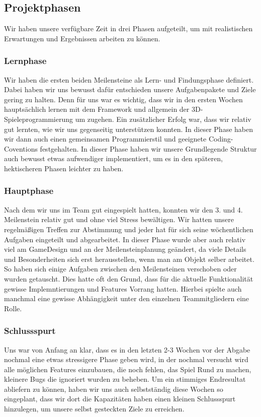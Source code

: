 \documentclass[12pt]{article}
\begin{document}
\vspace{2cm}
\subsection{Projektphasen}
Wir haben unsere verfügbare Zeit in drei Phasen aufgeteilt, um mit realistischen Erwartungen und Ergebnissen arbeiten zu können. \newline
\subsubsection{Lernphase}
Wir haben die ersten beiden Meilensteine als Lern- und Findungsphase definiert. Dabei haben wir uns bewusst dafür entschieden unsere Aufgabenpakete und Ziele gering zu halten.
Denn für uns war es wichtig, dass wir in den ersten Wochen hauptsächlich lernen mit dem Framework und allgemein der 3D-Spieleprogrammierung um zugehen. Ein zusätzlicher Erfolg war, dass wir relativ gut lernten, wie wir uns gegenseitig unterstützen konnten. In dieser Phase haben wir dann auch einen gemeinsamen Programmierstil und geeignete Coding-Coventions festgehalten. In dieser Phase haben wir unsere Grundlegende Struktur auch bewusst etwas aufwendiger implementiert, um es in den späteren, hektischeren Phasen leichter zu haben.

\subsubsection{Hauptphase}
Nach dem wir uns im Team gut eingespielt hatten, konnten wir den 3. und 4. Meilenstein relativ gut und ohne viel Stress bewältigen. Wir hatten unsere regelmäßigen Treffen zur Abstimmung und jeder hat für sich seine wöchentlichen Aufgaben eingeteilt und abgearbeitet. \newline
In dieser Phase wurde aber auch relativ viel am GameDesign und an der Meilensteinplanung geändert, da viele Details und Besonderheiten sich erst herausstellen, wenn man am Objekt selber arbeitet. So haben sich einige Aufgaben zwischen den Meilensteinen verschoben oder wurden getauscht. Dies hatte oft den Grund, dass für die aktuelle Funktionalität gewisse Implemntierungen und Features Vorrang hatten. Hierbei spielte auch manchmal eine gewisse Abhängigkeit unter den einzelnen Teammitgliedern eine Rolle.

\subsubsection{Schlussspurt}
Uns war von Anfang an klar, dass es in den letzten 2-3 Wochen vor der Abgabe nochmal eine etwas stressigere Phase geben wird, in der nochmal versucht wird alle möglichen Features einzubauen, die noch fehlen, das Spiel Rund zu machen, kleinere Bugs die ignoriert wurden zu beheben. Um ein stimmiges Endresultat abliefern zu können, haben wir uns auch selbstständig diese Wochen so eingeplant, dass wir dort die Kapazitäten haben einen kleinen Schlussspurt hinzulegen, um unsere selbst gesteckten Ziele zu erreichen.
\end{document}
